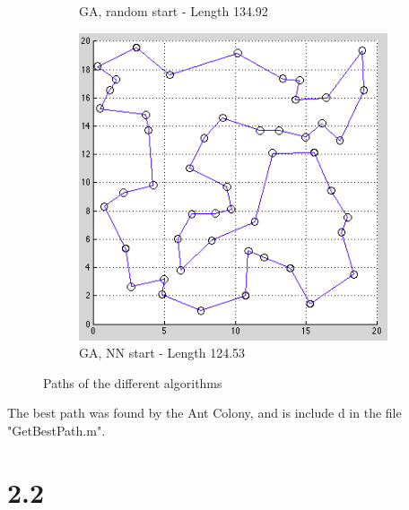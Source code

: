 \documentclass{article}
\begin{document}
\begin{figure}[!ht]
\begin{subfigure}[b]{0.3\textwidth}
                \caption{GA, random start - Length 134.92}
                \label{fig:GA-random}
        \end{subfigure}
        \begin{subfigure}[b]{0.3\textwidth}
                \includegraphics[width=\textwidth]{21d}
                \caption{GA, NN start - Length 124.53}
                \label{fig:GA-NN}
        \end{subfigure}
        \caption{Paths of the different algorithms}\label{fig:algorithms}
\end{figure}

The best path was found by the Ant Colony, and is include	d in the file "GetBestPath.m".
\newpage

\section{2.2}
\end{document}
